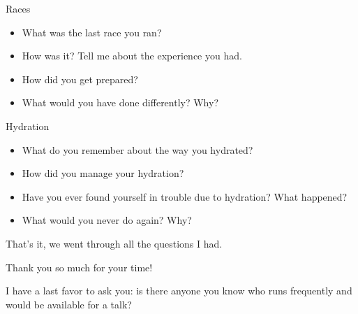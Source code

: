 Races

\begin{itemize}
\item What was the last race you ran?
\item How was it? Tell me about the experience you had.
\item How did you get prepared?
\item What would you have done differently? Why?
\end{itemize}

Hydration

\begin{itemize}
\item What do you remember about the way you hydrated?
\item How did you manage your hydration?
\item Have you ever found yourself in trouble due to hydration? What happened?
\item What would you never do again? Why?
\end{itemize}

That's it, we went through all the questions I had.

Thank you so much for your time!

I have a last favor to ask you: is there anyone you know who runs frequently and would be available for a talk?

